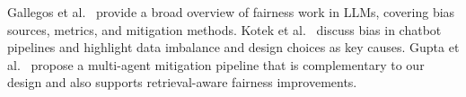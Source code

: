 \documentclass[conference]{IEEEtran}
\begin{document}
Gallegos et al.~\cite{gallegos2024survey} provide a broad overview of fairness work in LLMs, covering bias sources, metrics, and mitigation methods. Kotek et al.~\cite{chatbot_bias2023} discuss bias in chatbot pipelines and highlight data imbalance and design choices as key causes. Gupta et al.~\cite{bias_agent2025} propose a multi-agent mitigation pipeline that is complementary to our design and also supports retrieval-aware fairness improvements.





\end{document}
